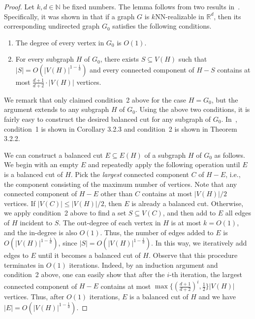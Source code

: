 \documentclass[11pt]{article}
\begin{document}
\begin{proof}
Let $k,d \in \mathbb{N}$ be fixed numbers.
The lemma follows from two results in~\cite{miller:1997}.
Specifically, it was shown in \cite{miller:1997} that if a graph $G$ is $k$NN-realizable in $\mathbb{R}^d$, then its corresponding undirected graph $G_0$ satisfies the following conditions.
\begin{enumerate}
    \item The degree of every vertex in $G_0$ is $O(1)$.
    \item For every subgraph $H$ of $G_0$, there exists $S \subseteq V(H)$ such that $|S| = O(|V(H)|^{1-\frac{1}{d}})$ and every connected component of $H - S$ contains at most $\frac{d+1}{d+2} \cdot |V(H)|$ vertices.
\end{enumerate}
We remark that \cite{miller:1997} only claimed condition~2 above for the case $H = G_0$, but the argument extends to any subgraph $H$ of $G_0$.
Using the above two conditions, it is fairly easy to construct the desired balanced cut for any subgraph of $G_0$.
In~\cite{miller:1997}, condition~1 is shown in Corollary 3.2.3 and condition~2 is shown in Theorem 3.2.2.

We can construct a balanced cut $E \subseteq E(H)$ of a subgraph $H$ of $G_0$ as follows.
We begin with an empty $E$ and repeatedly apply the following operation until $E$ is a balanced cut of $H$.
Pick the \textit{largest} connected component $C$ of $H-E$, i.e., the component consisting of the maximum number of vertices.
Note that any connected component of $H-E$ other than $C$ contains at most $|V(H)|/2$ vertices.
If $|V(C)| \leq |V(H)|/2$, then $E$ is already a balanced cut.
Otherwise, we apply condition~2 above to find a set $S \subseteq V(C)$, and then add to $E$ all edges of $H$ incident to $S$.
The out-degree of each vertex in $H$ is at most $k = O(1)$, and the in-degree is also $O(1)$.
Thus, the number of edges added to $E$ is $O(|V(H)|^{1-\frac{1}{d}})$, since $|S| = O(|V(H)|^{1-\frac{1}{d}})$.
In this way, we iteratively add edges to $E$ until it becomes a balanced cut of $H$.
Observe that this procedure terminates in $O(1)$ iterations.
Indeed, by an induction argument and condition~2 above, one can easily show that after the $i$-th iteration, the largest connected component of $H-E$ contains at most $\max\{(\frac{d+1}{d+2})^i,\frac{1}{2}\} |V(H)|$ vertices.
Thus, after $O(1)$ iterations, $E$ is a balanced cut of $H$ and we have $|E| = O(|V(H)|^{1-\frac{1}{d}})$.
\end{proof}
\end{document}
